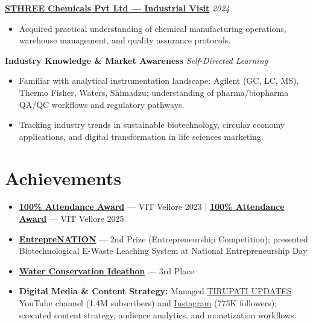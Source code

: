 \documentclass[10pt, a4paper]{article}
\newcommand{\roleentry}[2]{%
  \textbf{#1} \hfill \textit{#2}%
}
\newenvironment{rlist}{%
  \begin{itemize}[
    leftmargin=1.4em,
    itemsep=1.5pt,
    parsep=0pt,
    topsep=2pt,
    label=\textcolor{accentNavy}{\textbullet}
  ]
}{\end{itemize}}
\begin{document}
\vspace{4pt}

\roleentry{\href{https://drive.google.com/file/d/14GNM2mWTy7VgPcyfnQZb3BGmjEtPb0mK/view?usp=sharing}{STHREE Chemicals Pvt Ltd --- Industrial Visit}}{2024}
\begin{rlist}
  \item Acquired practical understanding of chemical manufacturing operations, warehouse management, and quality assurance protocols.
\end{rlist}

\vspace{4pt}

\roleentry{Industry Knowledge \& Market Awareness}{Self-Directed Learning}
\begin{rlist}
  \item Familiar with analytical instrumentation landscape: Agilent (GC, LC, MS), Thermo Fisher, Waters, Shimadzu; understanding of pharma/biopharma QA/QC workflows and regulatory pathways.
  \item Tracking industry trends in sustainable biotechnology, circular economy applications, and digital transformation in life sciences marketing.
\end{rlist}

\section{Achievements}

\begin{rlist}
  \item \href{https://drive.google.com/file/d/13hdaMD5yXOPebf-0RGLRmaXKOJ-66eTz/view?usp=sharing}{\textbf{100\% Attendance Award}} --- VIT Vellore 2023 \quad\textcolor{ruleGray}{|}
        \href{https://drive.google.com/file/d/13ksrArjo8xcIlWzYurlscTiYHj1Xx6FB/view?usp=sharing}{\textbf{100\% Attendance Award}} --- VIT Vellore 2025
  \item \href{https://drive.google.com/file/d/1YpBVuZJjBDPGJlKpa15bsX9v6fv0g9cG/view?usp=drivesdk}{\textbf{EntrepreNATION}} --- 2nd Prize (Entrepreneurship Competition); presented Biotechnological E-Waste Leaching System at National Entrepreneurship Day
  \item \href{https://drive.google.com/file/d/13tSKgQVm_-2kLm6Hb_Zvaamy0gZKc6Gx/view?usp=sharing}{\textbf{Water Conservation Ideathon}} --- 3rd Place
  \item \textbf{Digital Media \& Content Strategy:} Managed \href{https://youtube.com/@tirupathiupdates?si=vBRqi5VH_BJdf3lE}{TIRUPATI UPDATES} YouTube channel (1.4M subscribers) and \href{https://www.instagram.com/tirupathiupdates?igsh=MTZmb3YybDViYmg3bA==}{Instagram} (775K followers); executed content strategy, audience analytics, and monetization workflows.
\end{rlist}
\end{document}
